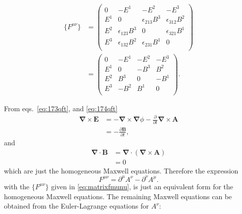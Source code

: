 \begin{align}
  \{F^{\mu\nu}\}  &=
  \begin{pmatrix}
    0 &-E^1   &-E^2   &-E^3   \\    
    E^1&0     &\epsilon_{213}B^3&\epsilon_{312}B^2\\
    E^2&\epsilon_{123}B^3&0     &\epsilon_{321}B^1\\
    E^3&\epsilon_{132}B^2&\epsilon_{231}B^1&0\\
  \end{pmatrix}\nonumber\\
  &=
\label{eq:matrixfmunu}
  \begin{pmatrix}
    0 &-E^1&-E^2&-E^3   \\    
    E^1&0  &-B^3&B^2\\
    E^2&B^3 &0  &-B^1\\
    E^3&-B^2&B^1 &0\\
  \end{pmatrix}.
\end{align}


From eqs.~\eqref{eq:173qft}, and \eqref{eq:174qft}
\begin{align*}
  \boldsymbol{\nabla}\times \mathbf{E}&=-\boldsymbol{\nabla}\times \boldsymbol{\nabla}\phi-\frac{\partial}{\partial t}\boldsymbol{\nabla}\times \mathbf{A}\\
  &=-\frac{\partial\mathbf{B}}{\partial t},
\end{align*}
and
\begin{align*}
  \boldsymbol{\nabla}\cdot\mathbf{B}&=\boldsymbol{\nabla}\cdot(\boldsymbol{\nabla}\times \mathbf{A})\\
  &=0
\end{align*}
which are just the homogeneous Maxwell equations. Therefore the expression
 \begin{equation}
  \label{eq:fmunu}
    F^{\mu\nu}=\partial^\mu A^\nu-\partial^\nu A^\mu.
\end{equation}
with the $\{F^{\mu\nu}\}$ given in \eqref{eq:matrixfmunu}, is just an equivalent form for the homogeneous Maxwell equations. The remaining Maxwell equations can be obtained from the Euler-Lagrange equations for $A^\nu$:


